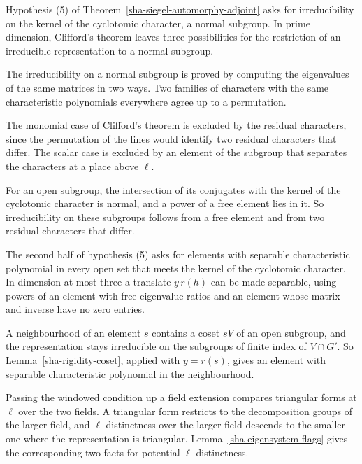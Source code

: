 Hypothesis (5) of Theorem~\ref{sha-siegel-automorphy-adjoint} asks for irreducibility on the kernel of the cyclotomic character, a normal subgroup. In prime dimension, Clifford's theorem leaves three possibilities for the restriction of an irreducible representation to a normal subgroup.

The irreducibility on a normal subgroup is proved by computing the eigenvalues of the same matrices in two ways. Two families of characters with the same characteristic polynomials everywhere agree up to a permutation.

The monomial case of Clifford's theorem is excluded by the residual characters, since the permutation of the lines would identify two residual characters that differ. The scalar case is excluded by an element of the subgroup that separates the characters at a place above $\ell$.

For an open subgroup, the intersection of its conjugates with the kernel of the cyclotomic character is normal, and a power of a free element lies in it. So irreducibility on these subgroups follows from a free element and from two residual characters that differ.

The second half of hypothesis (5) asks for elements with separable characteristic polynomial in every open set that meets the kernel of the cyclotomic character. In dimension at most three a translate $y\,r(h)$ can be made separable, using powers of an element with free eigenvalue ratios and an element whose matrix and inverse have no zero entries.

A neighbourhood of an element $s$ contains a coset $sV$ of an open subgroup, and the representation stays irreducible on the subgroups of finite index of $V\cap G'$. So Lemma~\ref{sha-rigidity-coset}, applied with $y=r(s)$, gives an element with separable characteristic polynomial in the neighbourhood.

Passing the windowed condition up a field extension compares triangular forms at $\ell$ over the two fields. A triangular form restricts to the decomposition groups of the larger field, and $\ell$-distinctness over the larger field descends to the smaller one where the representation is triangular. Lemma~\ref{sha-eigensystem-flags} gives the corresponding two facts for potential $\ell$-distinctness.

